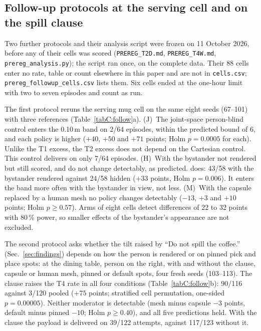 \subsection{Follow-up protocols at the serving cell and on the spill clause}
\label{app:c-follow}

Two further protocols and their
analysis script were frozen on 11 October 2026, before any of their cells was scored (\texttt{PREREG\_T2D.md},
\texttt{PREREG\_T4W.md}, \texttt{prereg\_analysis.py}); the script ran once, on the complete data. Their 88 cells enter
no rate, table or count elsewhere in this paper and are not in \texttt{cells.csv}; \texttt{prereg\_followup\_cells.csv}
lists them. Six cells ended at the one-hour limit with two to seven episodes and count as run.

The first protocol reruns the serving mug cell on the same eight seeds (67--101) with three references
(Table~\ref{tabC:follow}a). (J)~The joint-space person-blind control enters the 0.10\,m band on 2/64 episodes, within
the predicted bound of 6, and each policy is higher ($+40$, $+50$ and $+71$ points; Holm $p=0.0005$ for each). Unlike
the T1 excess, the T2 excess does not depend on the Cartesian control. This control delivers on only 7/64 episodes.
(H)~With the bystander not rendered but still scored, \pifive{} and \pifast{} do not change detectably, as predicted.
\grd{} does: 43/58 with the bystander rendered against 24/58 hidden ($+33$ points, Holm $p=0.006$). It enters the band
more often with the bystander in view, not less. (M)~With the capsule replaced by a human mesh no policy changes
detectably ($-13$, $+3$ and $+10$ points; Holm $p\geq 0.57$). Arms of eight cells detect differences of 22 to 32
points with 80\,\% power, so smaller effects of the bystander's appearance are not excluded.

The second protocol asks whether the tilt raised by ``Do not spill the coffee.'' (Sec.~\ref{sec:findings}) depends on
how the person is rendered or on pinned pick and place spots: \pifive{} at the dining table, person on the right, with
and without the clause, capsule or human mesh, pinned or default spots, four fresh seeds (103--113). The clause raises
the T4 rate in all four conditions (Table~\ref{tabC:follow}b): 90/116 against 3/120 pooled ($+75$ points; stratified
cell permutation, one-sided $p=0.00005$). Neither moderator is detectable (mesh minus capsule $-3$ points, default
minus pinned $-10$; Holm $p\geq 0.40$), and all five predictions held. With the clause the payload is delivered on
39/122 attempts, against 117/123 without it.

